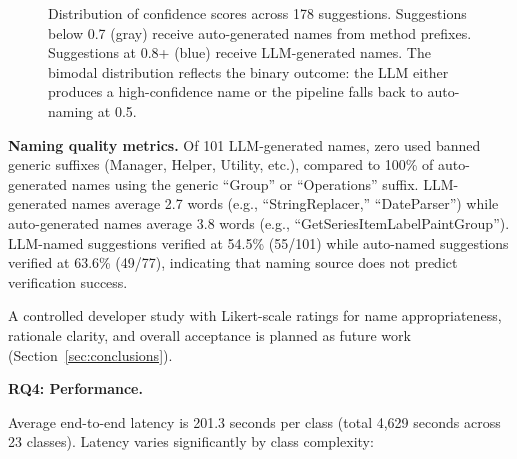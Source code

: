 \documentclass[sigconf]{acmart}
\begin{document}
\begin{figure}[t]
\centering
{}
\caption{Distribution of confidence scores across 178 suggestions.
Suggestions below 0.7 (gray) receive auto-generated names from method
prefixes. Suggestions at 0.8+ (blue) receive LLM-generated names.
The bimodal distribution reflects the binary outcome: the LLM either
produces a high-confidence name or the pipeline falls back to
auto-naming at 0.5.}
\label{fig:confidence}
\end{figure}

\textbf{Naming quality metrics.}  Of 101 LLM-generated names, zero used banned
generic suffixes (Manager, Helper, Utility, etc.), compared to 100\% of
auto-generated names using the generic ``Group'' or ``Operations'' suffix.
LLM-generated names average 2.7 words (e.g., ``StringReplacer,''
``DateParser'') while auto-generated names average 3.8 words (e.g.,
``GetSeriesItemLabelPaintGroup''). LLM-named suggestions verified at 54.5\%
(55/101) while auto-named suggestions verified at 63.6\% (49/77), indicating
that naming source does not predict verification success.

A controlled developer study with Likert-scale ratings for name
appropriateness, rationale clarity, and overall acceptance is planned as future
work (Section~\ref{sec:conclusions}).

\textbf{RQ4: Performance.}

Average end-to-end latency is 201.3 seconds per class (total 4,629 seconds
across 23 classes). Latency varies significantly by class complexity:
\end{document}
